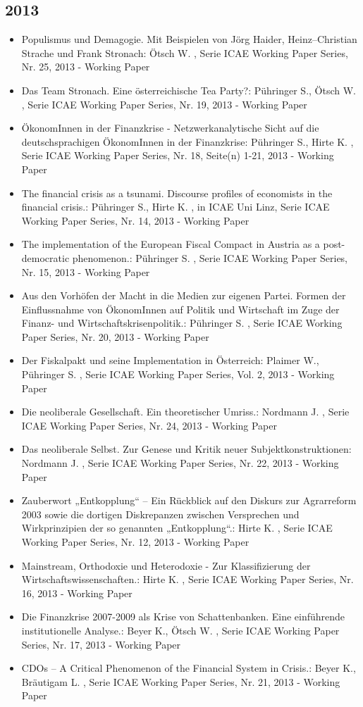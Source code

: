  \subsection{2013} 
 \begin{itemize} 
	 \item Populismus und Demagogie. Mit Beispielen von Jörg Haider, Heinz–Christian Strache und Frank Stronach: Ötsch W. , Serie ICAE Working Paper Series, Nr. 25, 2013 - Working Paper
	 \item Das Team Stronach. Eine österreichische Tea Party?: Pühringer S., Ötsch W. , Serie ICAE Working Paper Series, Nr. 19, 2013 - Working Paper
	 \item ÖkonomInnen in der Finanzkrise - Netzwerkanalytische Sicht auf die deutschsprachigen ÖkonomInnen in der Finanzkrise: Pühringer S., Hirte K. , Serie ICAE Working Paper Series, Nr. 18, Seite(n) 1-21, 2013 - Working Paper
	 \item The financial crisis as a tsunami. Discourse profiles of economists in the financial crisis.: Pühringer S., Hirte K. , in ICAE Uni Linz, Serie ICAE Working Paper Series, Nr. 14, 2013 - Working Paper
	 \item The implementation of the European Fiscal Compact in Austria as a post-democratic phenomenon.: Pühringer S. , Serie ICAE Working Paper Series, Nr. 15, 2013 - Working Paper
	 \item Aus den Vorhöfen der Macht in die Medien zur eigenen Partei. Formen der Einflussnahme von ÖkonomInnen auf Politik und Wirtschaft im Zuge der Finanz-­ und Wirtschaftskrisenpolitik.: Pühringer S. , Serie ICAE Working Paper Series, Nr. 20, 2013 - Working Paper
	 \item Der Fiskalpakt und seine Implementation in Österreich: Plaimer W., Pühringer S. , Serie ICAE Working Paper Series, Vol. 2, 2013 - Working Paper
	 \item Die neoliberale Gesellschaft. Ein theoretischer Umriss.: Nordmann J. , Serie ICAE Working Paper Series, Nr. 24, 2013 - Working Paper
	 \item Das neoliberale Selbst. Zur Genese und Kritik neuer Subjektkonstruktionen: Nordmann J. , Serie ICAE Working Paper Series, Nr. 22, 2013 - Working Paper
	 \item Zauberwort „Entkopplung“ – Ein Rückblick auf den Diskurs zur Agrarreform 2003 sowie die dortigen Diskrepanzen zwischen Versprechen und Wirkprinzipien der so genannten „Entkopplung“.: Hirte K. , Serie ICAE Working Paper Series, Nr. 12, 2013 - Working Paper
	 \item Mainstream, Orthodoxie und Heterodoxie - Zur Klassifizierung der Wirtschaftswissenschaften.: Hirte K. , Serie ICAE Working Paper Series, Nr. 16, 2013 - Working Paper
	 \item Die Finanzkrise 2007-2009 als Krise von Schattenbanken. Eine einführende institutionelle Analyse.: Beyer K., Ötsch W. , Serie ICAE Working Paper Series, Nr. 17, 2013 - Working Paper
	 \item CDOs – A Critical Phenomenon of the Financial System in Crisis.: Beyer K., Bräutigam L. , Serie ICAE Working Paper Series, Nr. 21, 2013 - Working Paper
\end{itemize} 
